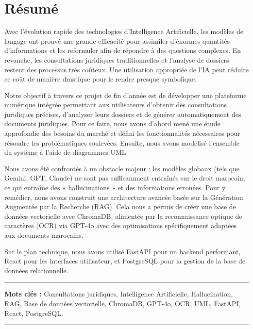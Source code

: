 \chapter*{Résumé}

Avec l'évolution rapide des technologies d'Intelligence Artificielle, les modèles de langage ont prouvé une grande efficacité pour assimiler d'énormes quantités d'informations et les reformuler afin de répondre à des questions complexes. En revanche, les consultations juridiques traditionnelles et l'analyse de dossiers restent des processus très coûteux. Une utilisation appropriée de l'IA peut réduire ce coût de manière drastique pour le rendre presque symbolique.

Notre objectif à travers ce projet de fin d'année est de développer une plateforme numérique intégrée permettant aux utilisateurs d'obtenir des consultations juridiques précises, d'analyser leurs dossiers et de générer automatiquement des documents juridiques. Pour ce faire, nous avons d'abord mené une étude approfondie des besoins du marché et défini les fonctionnalités nécessaires pour résoudre les problématiques soulevées. Ensuite, nous avons modélisé l'ensemble du système à l'aide de diagrammes UML.

Nous avons été confrontés à un obstacle majeur : les modèles globaux (tels que Gemini, GPT, Claude) ne sont pas suffisamment entraînés sur le droit marocain, ce qui entraîne des « hallucinations » et des informations erronées. Pour y remédier, nous avons construit une architecture avancée basée sur la Génération Augmentée par la Recherche (RAG). Cela nous a permis de créer une base de données vectorielle avec ChromaDB, alimentée par la reconnaissance optique de caractères (OCR) via GPT-4o avec des optimisations spécifiquement adaptées aux documents marocains.

Sur le plan technique, nous avons utilisé FastAPI pour un backend performant, React pour les interfaces utilisateur, et PostgreSQL pour la gestion de la base de données relationnelle.

\noindent\rule[2pt]{\textwidth}{0.5pt}

{\textbf{Mots clés :}}
Consultations juridiques, Intelligence Artificielle, Hallucination, RAG, Base de données vectorielle, ChromaDB, GPT-4o, OCR, UML, FastAPI, React, PostgreSQL.
\\
\noindent\rule[2pt]{\textwidth}{0.5pt}